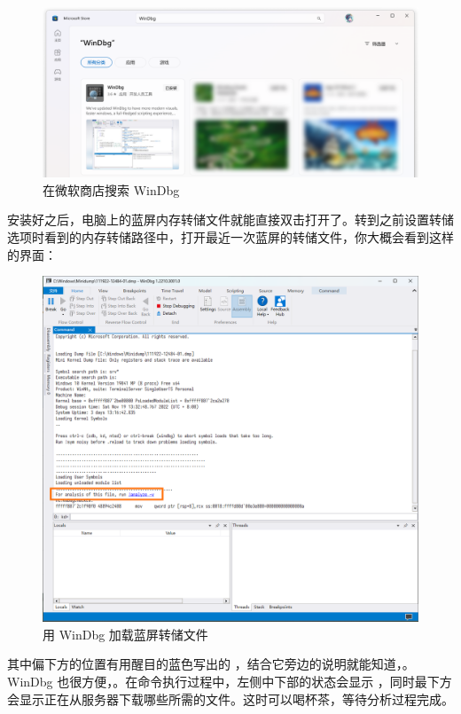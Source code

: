 \begin{figure}[htb!]
  \centering
  \includegraphics[width=.8\textwidth]{assets/advanced/WinDbg.png}
  \caption{在微软商店搜索 WinDbg}
  \label{fig:WinDbg}
\end{figure}

安装好之后，电脑上的蓝屏内存转储文件就能直接双击打开了。转到之前设置转储选项时看到的内存转储路径中，打开最近一次蓝屏的转储文件，你大概会看到这样的界面：

\begin{figure}[htb!]
  \centering
  \includegraphics[width=.8\textwidth]{assets/advanced/WinDbg-1.png}
  \caption{用 WinDbg 加载蓝屏转储文件}
  \label{fig:WinDbg-1}
\end{figure}

其中偏下方的位置有用醒目的蓝色写出的 ，结合它旁边的说明就能知道，。WinDbg 也很方便，。在命令执行过程中，左侧中下部的状态会显示 ，同时最下方会显示正在从服务器下载哪些所需的文件。这时可以喝杯茶，等待分析过程完成。


